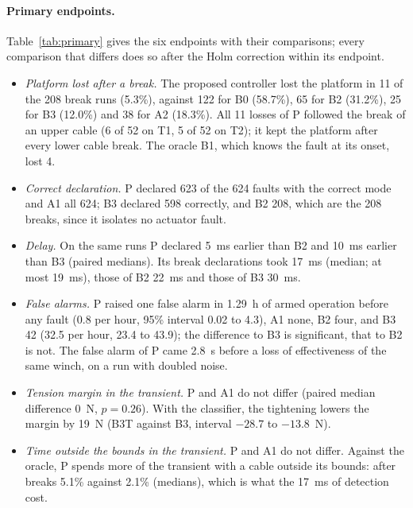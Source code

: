 \documentclass[10pt]{article}
\begin{document}
\paragraph{Primary endpoints.} Table~\ref{tab:primary} gives the six endpoints with their comparisons; every comparison that differs does so after the Holm correction within its endpoint.
\begin{itemize}
\item \emph{Platform lost after a break.} The proposed controller lost the platform in 11 of the 208 break runs (5.3\%), against 122 for B0 (58.7\%), 65 for B2 (31.2\%), 25 for B3 (12.0\%) and 38 for A2 (18.3\%). All 11 losses of P followed the break of an upper cable (6 of 52 on T1, 5 of 52 on T2); it kept the platform after every lower cable break. The oracle B1, which knows the fault at its onset, lost 4.
\item \emph{Correct declaration.} P declared 623 of the 624 faults with the correct mode and A1 all 624; B3 declared 598 correctly, and B2 208, which are the 208 breaks, since it isolates no actuator fault.
\item \emph{Delay.} On the same runs P declared 5~ms earlier than B2 and 10~ms earlier than B3 (paired medians). Its break declarations took 17~ms (median; at most 19~ms), those of B2 22~ms and those of B3 30~ms.
\item \emph{False alarms.} P raised one false alarm in 1.29~h of armed operation before any fault (0.8 per hour, 95\% interval 0.02 to 4.3), A1 none, B2 four, and B3 42 (32.5 per hour, 23.4 to 43.9); the difference to B3 is significant, that to B2 is not. The false alarm of P came 2.8~s before a loss of effectiveness of the same winch, on a run with doubled noise.
\item \emph{Tension margin in the transient.} P and A1 do not differ (paired median difference 0~N, $p=0.26$). With the classifier, the tightening lowers the margin by 19~N (B3T against B3, interval $-28.7$ to $-13.8$~N).
\item \emph{Time outside the bounds in the transient.} P and A1 do not differ. Against the oracle, P spends more of the transient with a cable outside its bounds: after breaks 5.1\% against 2.1\% (medians), which is what the 17~ms of detection cost.
\end{itemize}


\end{document}
